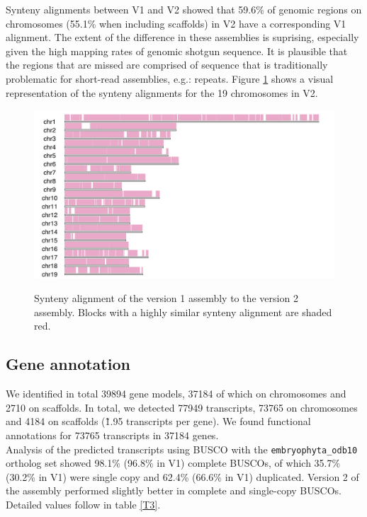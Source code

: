 \documentclass{article}
\begin{document}
Synteny alignments between V1 and V2 showed that 59.6\% of genomic regions on chromosomes (55.1\% when including scaffolds) in V2 have a corresponding V1 alignment. The extent of the difference in these assemblies is suprising, especially given the high mapping rates of genomic shotgun sequence. It is plausible that the regions that are missed are comprised of sequence that is traditionally problematic for short-read assemblies, e.g.: repeats. Figure \ref{F1} shows a visual representation of the synteny alignments for the 19 chromosomes in V2. 

\begin{figure}
\includegraphics[width=\textwidth]{pv1synteny.png}
\label{F1}
\caption{Synteny alignment of the version 1 assembly to the version 2 assembly. Blocks with a highly similar synteny alignment are shaded red.}
\end{figure}

\subsection{Gene annotation}
We identified in total 39894 gene models, 37184 of which on chromosomes and 2710 on scaffolds. In total, we detected 77949 transcripts, 73765 on chromosomes and 4184 on scaffolds (\~1.95 transcripts per gene). We found functional annotations for 73765 transcripts in 37184 genes.\\
Analysis of the predicted transcripts using BUSCO with the \verb|embryophyta_odb10| ortholog set showed 98.1\% (96.8\% in V1) complete BUSCOs, of which 35.7\% (30.2\% in V1) were single copy and 62.4\% (66.6\% in V1) duplicated. Version 2 of the assembly performed slightly better in complete and single-copy BUSCOs. Detailed values follow in table \ref{T3}.\\
\end{document}
